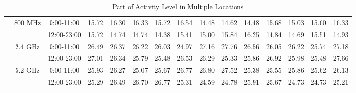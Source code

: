 \begin{table}
\begin{tabular}{|l|c|c|c|c|c|c|c|c|c|c|c|c|c|c|}
\cline{2-15}	
&\multirow{2}{*}{800 MHz}	
&0:00-11:00 &  15.72 &  16.30 &  16.33 &  15.72 &  16.54 &  14.48&  14.62 &  14.48&  15.68 &  15.03&  15.60 &  16.33 \\ 	
\cline{3-15}	
&&12:00-23:00&  15.72 &  14.74 &  14.74 &  14.38 &  15.41 &  15.00&  15.84 &  16.25&  14.84 &  14.69&  15.51 &  14.93 \\ 	
\cline{2-15}	
&\multirow{2}{*}{2.4 GHz}	
&0:00-11:00 &  26.49 &  26.37 &  26.22 &  26.03 &  24.97 &  27.16&  27.76 &  26.56&  26.05 &  26.22&  25.74 &  27.18 \\ 	
\cline{3-15}	
&&12:00-23:00&  27.01 &  26.34 &  25.79 &  25.48 &  26.53 &  26.29&  25.33 &  25.86&  26.92 &  25.98&  25.48 &  27.66 \\ 	
\cline{2-15}	
&\multirow{2}{*}{5.2 GHz}	
&0:00-11:00 &  25.93 &  26.27 &  25.07 &  25.67 &  26.77 &  26.80&  27.52 &  25.38&  25.55 &  25.86&  25.62 &  26.13 \\ 	
\cline{3-15}	
&&12:00-23:00&  25.29 &  26.49 &  26.70 &  26.77 &  25.31 &  24.59&  24.78 &  25.91&  25.67 &  24.73&  24.73 &  25.21 \\ 	
%
\hline	
\end{tabular}    
\caption{Part of Activity Level in Multiple Locations} %
\label{tab:activitymeasurement}    
\vspace{-0.3in}
\end{table}    



